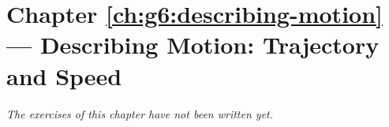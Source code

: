 \section*{Chapter \ref{ch:g6:describing-motion} --- Describing Motion: Trajectory and Speed}


\emph{The exercises of this chapter have not been written yet.}
